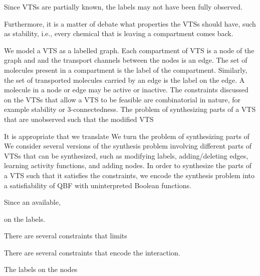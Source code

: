 Since VTSs are partially known, 
%
the labels may not have been fully observed.


Furthermore, it is a matter of debate what properties the VTSs should
have, such as stability, i.e., every chemical that is leaving a
compartment comes back.



We model a VTS as a labelled graph.
%
Each compartment of VTS is a node of the graph and and the
transport channels between the nodes is an edge.
%
The set of molecules present in a compartment is the label of
the compartment.
% 
Similarly, the set of transported molecules carried by an edge is the label
on the edge.
%
A molecule in a node or edge may be active or inactive. 
%
The constraints discussed on the VTSs that allow a VTS to be feasible
are combinatorial in nature, for example stability or 3-connectedness.
%
The problem of synthesizing parts of a VTS that are unobserved such that 
the modified VTS 

It is appropriate that we translate 
We turn the problem of synthesizing parts of 
%
We consider several versions of the synthesis problem involving different
parts of VTSs that can be synthesized, such as modifying labels,
adding/deleting edges, learning activity functions, and adding nodes.
%
In order to synthesize the parts of a VTS such that it satisfies the constraints, 
we encode the synthesis problem into a satisfiability of QBF with uninterpreted
Boolean functions. 


Since an available, 

on the labels.


There are several constraints that limits 

There are several constraints that encode the interaction.


The labels on the nodes 



